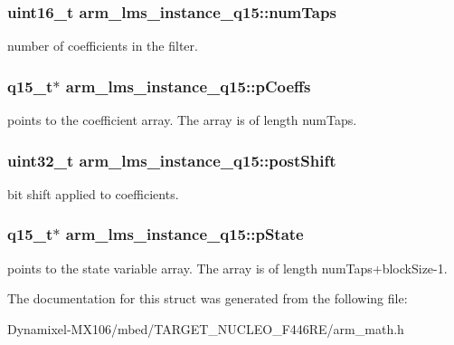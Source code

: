 \subsubsection[{\texorpdfstring{num\+Taps}{numTaps}}]{\setlength{\rightskip}{0pt plus 5cm}uint16\+\_\+t arm\+\_\+lms\+\_\+instance\+\_\+q15\+::num\+Taps}\hypertarget{structarm__lms__instance__q15_a0078e894f805af1b360369e619fb57b3}{}\label{structarm__lms__instance__q15_a0078e894f805af1b360369e619fb57b3}
number of coefficients in the filter. 
\subsubsection[{\texorpdfstring{p\+Coeffs}{pCoeffs}}]{\setlength{\rightskip}{0pt plus 5cm}q15\+\_\+t$\ast$ arm\+\_\+lms\+\_\+instance\+\_\+q15\+::p\+Coeffs}\hypertarget{structarm__lms__instance__q15_a42f95368b94898eb82608e1113d18cab}{}\label{structarm__lms__instance__q15_a42f95368b94898eb82608e1113d18cab}
points to the coefficient array. The array is of length num\+Taps. 
\subsubsection[{\texorpdfstring{post\+Shift}{postShift}}]{\setlength{\rightskip}{0pt plus 5cm}uint32\+\_\+t arm\+\_\+lms\+\_\+instance\+\_\+q15\+::post\+Shift}\hypertarget{structarm__lms__instance__q15_acca5fbaef4a52ae411de24c9a0b929cf}{}\label{structarm__lms__instance__q15_acca5fbaef4a52ae411de24c9a0b929cf}
bit shift applied to coefficients. 
\subsubsection[{\texorpdfstring{p\+State}{pState}}]{\setlength{\rightskip}{0pt plus 5cm}q15\+\_\+t$\ast$ arm\+\_\+lms\+\_\+instance\+\_\+q15\+::p\+State}\hypertarget{structarm__lms__instance__q15_a9a575ff82c1e68cbb583083439260d08}{}\label{structarm__lms__instance__q15_a9a575ff82c1e68cbb583083439260d08}
points to the state variable array. The array is of length num\+Taps+block\+Size-\/1. 

The documentation for this struct was generated from the following file\+:\begin{DoxyCompactItemize}
\item 
Dynamixel-\/\+M\+X106/mbed/\+T\+A\+R\+G\+E\+T\+\_\+\+N\+U\+C\+L\+E\+O\+\_\+\+F446\+R\+E/arm\+\_\+math.\+h\end{DoxyCompactItemize}
